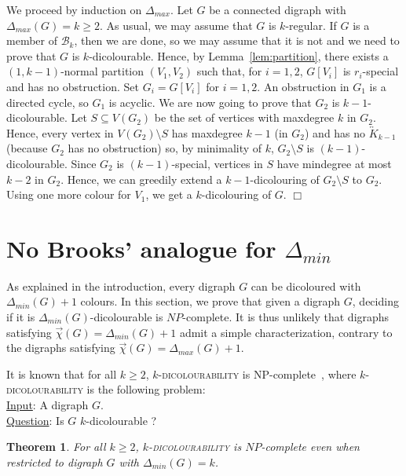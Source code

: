 \documentclass[11pt]{article}
\newtheorem{theorem}[lemma]{Theorem}
\newcommand{\mc}{\mathcal}
\newcommand{\dic}{\vec{\chi}}
\newcommand{\dmax}{\Delta_{max}}
\newcommand{\dmin}{\Delta_{min}}
\newcounter{claim}
\newenvironment{proof}[1][]%
 {\noindent {\setcounter{claim}{0}\sc proof ---
   }{#1}{}}{\hfill$\Box$\vspace{2ex}}
\begin{document}
\begin{proof}
We proceed by induction on $\Delta_{max}$. 
Let $G$ be a connected digraph with $\dmax(G) = k \geq 2$. As usual, we may assume that $G$ is $k$-regular. 
If $G$ is a member of $\mc B_k$, then we are done, so we may assume that it is not and we need to prove that $G$ is $k$-dicolourable. 
Hence, by Lemma~\ref{lem:partition}, there exists a $(1, k-1)$-normal partition $(V_1, V_2)$ such that, for $i=1, 2$,  $G[V_i]$ is $r_i$-special and has no obstruction. 
Set $G_i = G[V_i]$ for $i=1, 2$. An obstruction in $G_1$ is a directed cycle, so $G_1$ is acyclic. 
We are now going to prove that $G_2$ is $k-1$-dicolourable. 
Let $S \subseteq V(G_2)$ be the set of vertices with maxdegree $k$ in $G_2$. 
Hence, every vertex in $V(G_2) \setminus S$ has maxdegree $k-1$ (in $G_2$) and has no $\overleftrightarrow K_{k-1}$ (because $G_2$ has no obstruction) so, by minimality of $k$, $G_2 \setminus S$ is $(k-1)$-dicolourable. 
Since $G_2$ is $(k-1)$-special, vertices in $S$ have mindegree at most $k-2$ in $G_2$. Hence, we can greedily extend a $k-1$-dicolouring of $G_2 \setminus S$ to $G_2$. Using one more colour for $V_1$, we get a $k$-dicolouring of $G$. 
\end{proof}


\section{No Brooks' analogue for $\dmin$} \label{sec:dmin}

As explained in the introduction, every digraph $G$ can be dicoloured with $\dmin(G) + 1$ colours. 
In this section, we prove that given a digraph $G$, deciding if it is $\dmin(G)$-dicolourable is $NP$-complete. 
It is thus unlikely that digraphs satisfying $\dic(G) = \dmin(G)+1$ admit a simple characterization, contrary to the digraphs satisfying $\dic(G) = \dmax(G) +1$.  

It is known that for all $k \geq 2$, $k$-\textsc{dicolourability} is NP-complete~\cite{Bo04}, where $k$-\textsc{dicolourability} is the following problem:\\
\underline{Input}: A digraph $G$.\\
\underline{Question}: Is $G$ $k$-dicolourable ?

\begin{theorem}
For all $k \geq 2$, $k$-\textsc{dicolourability} is $NP$-complete even when restricted to digraph $G$ with $\dmin(G) = k$. 
\end{theorem}
\end{document}
